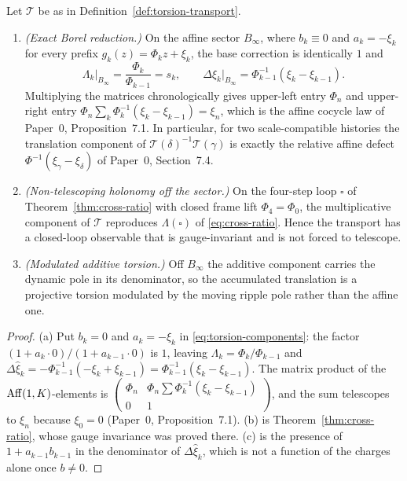 \begin{theorem}
\label{thm:torsion}
Let $\mathcal T$ be as in Definition~\ref{def:torsion-transport}.
\begin{enumerate}[label=(\alph*)]
  \item \emph{(Exact Borel reduction.)}  On the affine sector
  $B_\infty$, where $b_k\equiv0$ and $a_k=-\xi_k$ for every prefix
  $g_k(z)=\Phi_kz+\xi_k$, the base correction is identically $1$ and
  \begin{equation}\label{eq:borel-reduction}
    \Lambda_k\big|_{B_\infty}=\frac{\Phi_k}{\Phi_{k-1}}=s_k,
    \qquad
    \Delta\hat\xi_k\big|_{B_\infty}=\Phi_{k-1}^{-1}(\xi_k-\xi_{k-1}).
  \end{equation}
  Multiplying the matrices chronologically gives upper-left entry $\Phi_n$ and
  upper-right entry $\Phi_n\sum_k\Phi_k^{-1}(\xi_k-\xi_{k-1})=\xi_n$, which is
  the affine cocycle law of Paper~0, Proposition~7.1.  In particular, for two
  scale-compatible histories the translation component of
  $\mathcal T(\delta)^{-1}\mathcal T(\gamma)$ is exactly the relative affine
  defect $\Phi^{-1}(\xi_\gamma-\xi_\delta)$ of Paper~0, Section~7.4.
  \item \emph{(Non-telescoping holonomy off the sector.)}  On the four-step loop
  $\square$ of Theorem~\ref{thm:cross-ratio} with closed frame lift
  $\Phi_4=\Phi_0$, the multiplicative component of $\mathcal T$ reproduces
  $\Lambda(\square)$ of \eqref{eq:cross-ratio}.  Hence the transport has a
  closed-loop observable that is gauge-invariant and is not forced to telescope.
  \item \emph{(Modulated additive torsion.)}  Off $B_\infty$ the additive
  component carries the dynamic pole in its denominator, so the accumulated
  translation is a projective torsion modulated by the moving ripple pole rather
  than the affine one.
\end{enumerate}
\end{theorem}

\begin{proof}
(a) Put $b_k=0$ and $a_k=-\xi_k$ in \eqref{eq:torsion-components}: the factor
$(1+a_k\cdot0)/(1+a_{k-1}\cdot0)$ is $1$, leaving
$\Lambda_k=\Phi_k/\Phi_{k-1}$ and
$\Delta\hat\xi_k=-\Phi_{k-1}^{-1}(-\xi_k+\xi_{k-1})
=\Phi_{k-1}^{-1}(\xi_k-\xi_{k-1})$.  The matrix product of the
$\operatorname{Aff}(1,K)$-elements is
$\begin{pmatrix}\Phi_n&\Phi_n\sum\Phi_k^{-1}(\xi_k-\xi_{k-1})\\0&1\end{pmatrix}$,
and the sum telescopes to $\xi_n$ because $\xi_0=0$ (Paper~0,
Proposition~7.1).  (b) is Theorem~\ref{thm:cross-ratio}, whose gauge invariance
was proved there.  (c) is the presence of $1+a_{k-1}b_{k-1}$ in the denominator
of $\Delta\hat\xi_k$, which is not a function of the charges alone once
$b\ne0$.
\end{proof}

